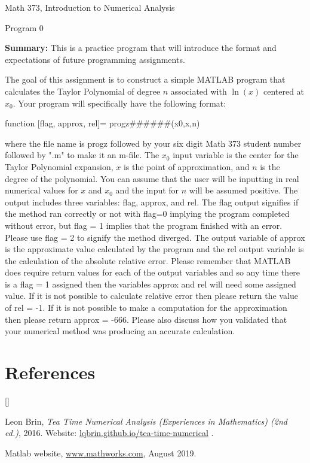 \documentclass{article}
\def\beginrefs{\begin{list}%
        {[\arabic{equation}]}{\usecounter{equation}
         \setlength{\leftmargin}{2.0truecm}\setlength{\labelsep}{0.4truecm}%
         \setlength{\labelwidth}{1.6truecm}}}
\def\endrefs{\end{list}}
\def\bibentry#1{\item[\hbox{[#1]}]}
\def\ds{\displaystyle}
\begin{document}

\large

{\Large Math 373, Introduction to Numerical Analysis}


{\Large Program 0} \par \medskip \noindent
%
{\bf Summary:} This is a practice program that will introduce the format and expectations of future programming assignments.  
\par \bigskip \par \noindent
The goal of this assignment is to construct a simple MATLAB program that calculates the Taylor Polynomial of degree $n$ associated with $\ln(x)$ centered at $\ds x_0$. Your program will specifically have the following format: \par \medskip
function [flag, approx, rel]= progz\#\#\#\#\#\#(x0,x,n) \par \medskip \noindent
%
where the file name is progz followed by your six digit Math 373 student number  followed by ".m" to make it an m-file. The $\ds x_0$ input variable is the center for the Taylor Polynomial expansion, $x$ is the point of approximation, and $n$ is the degree of the polynomial. You can assume that the user will be inputting in real numerical values for $x$ and $\ds x_0$ and the input for $n$ will be assumed positive. The output includes three variables: flag, approx, and rel. The flag output signifies if the method ran correctly or not with flag=0 implying the program completed without error, but flag = 1 implies that the program finished with an error. Please use flag = 2 to signify the method diverged. The output variable of approx is the approximate value calculated by the program and the rel output variable is the calculation of the absolute relative error. Please remember that MATLAB does require return values for each of the output variables and so any time there is a flag = 1 assigned then the variables approx and rel will need some assigned value. If it is not possible to calculate relative error then please return the value of rel = -1. If it is not possible to make a computation for the approximation then please return approx = -666. Please also discuss how you validated that your numerical method was producing an accurate calculation. 


\par \bigskip \par

\section*{References}
\beginrefs


\bibentry{LB16}{\sc Leon Brin},
{\it Tea Time Numerical Analysis (Experiences in Mathematics)  (2nd ed.)}, 2016. Website: \href{http://lqbrin.github.io/tea-time-numerical/}{lqbrin.github.io/tea-time-numerical} .

\bibentry{Matlab} {\sc Matlab website}, \href{https://www.mathworks.com}{www.mathworks.com}, August 2019. %

\endrefs
\end{document}
